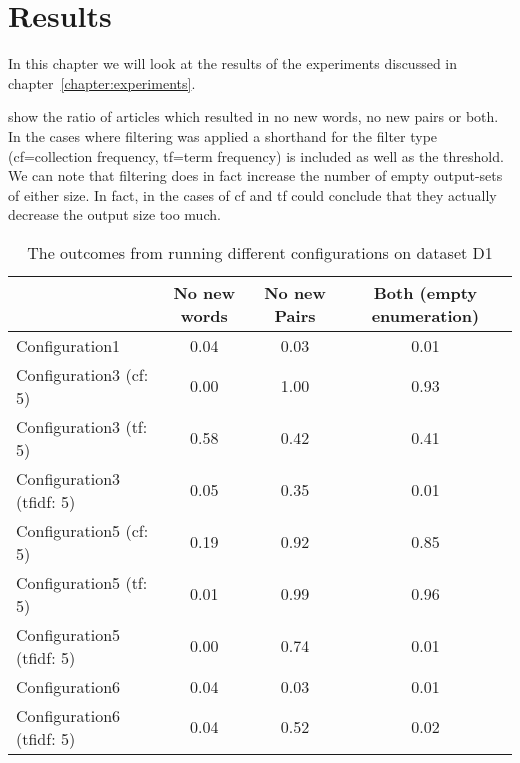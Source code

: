 \chapter{Results}
\label{chapter:results}
In this chapter we will look at the results of the experiments discussed in chapter~\ref{chapter:experiments}.

 show the ratio of articles which resulted in no new words, no new pairs or both. In the cases where filtering was applied a shorthand for the filter type (cf=collection frequency, tf=term frequency) is included as well as the threshold. We can note that filtering does in fact increase the number of empty output-sets of either size. In fact, in the cases of cf and tf could conclude that they actually decrease the output size too much.

\begin{center}
\begin{table}
  \begin{tabular}{|l|c|c|c|}
    \hline
    &  No new words & No new Pairs & Both (empty enumeration) \\ \hline
    Configuration1                    & 0.04  & 0.03  & 0.01 \\ \hline
    Configuration3 (cf: 5)            & 0.00  & 1.00  & 0.93 \\ \hline
    Configuration3 (tf: 5)            & 0.58  & 0.42  & 0.41 \\ \hline
    Configuration3 (tfidf: 5)         & 0.05  & 0.35  & 0.01 \\ \hline
    Configuration5 (cf: 5)            & 0.19  & 0.92  & 0.85 \\ \hline
    Configuration5 (tf: 5)            & 0.01  & 0.99  & 0.96 \\ \hline
    Configuration5 (tfidf: 5)         & 0.00  & 0.74  & 0.01 \\ \hline
    Configuration6                    & 0.04  & 0.03  & 0.01 \\ \hline
    Configuration6 (tfidf: 5)         & 0.04  & 0.52  & 0.02 \\ \hline
  \end{tabular}
  \caption{The outcomes from running different configurations on dataset D1}
  \label{tab:d1}
\end{table}
\end{center}

